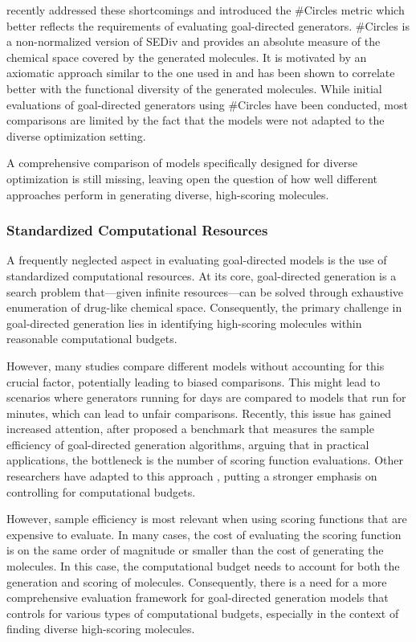 \citet{xieHowMuchSpace2023} recently addressed these shortcomings and introduced the \#Circles
metric which better reflects the requirements of evaluating goal-directed generators. \#Circles is a
non-normalized version of \ac{SEDiv} and provides an absolute measure of the chemical space covered by
the generated molecules. It is motivated by an axiomatic approach similar to the one used in
\citep{waldmanNovelAlgorithmsOptimization2000} and has been shown to correlate better with the
functional diversity of the generated molecules. While initial evaluations of goal-directed generators using \#Circles have been conducted, most comparisons are limited by the
fact that the models were not adapted to the diverse optimization setting.

A comprehensive
comparison of models specifically designed for diverse optimization is still missing, leaving open
the question of how well different approaches perform in generating diverse, high-scoring molecules.

\subsubsection{Standardized Computational Resources}
A frequently neglected aspect in evaluating goal-directed models is the use of standardized
computational resources. At its core, goal-directed generation is a search problem
that—given infinite resources—can be solved through exhaustive enumeration of drug-like chemical space.
Consequently, the primary challenge in goal-directed generation lies in identifying high-scoring molecules
within reasonable computational budgets.

However, many studies compare different models without accounting for this crucial factor,
potentially leading to biased comparisons. This might lead to scenarios where generators running for
days are compared to models that run for minutes, which can lead to unfair comparisons. Recently,
this issue has gained increased attention, after \citep{gaoSampleEfficiencyMatters2022} proposed a
benchmark that measures the sample efficiency of goal-directed generation algorithms, arguing
that in practical applications, the bottleneck is the number of scoring function evaluations. Other
researchers have adapted to this approach \citep{thomasReevaluatingSampleEfficiency2022,thomasAugmentedHillClimbIncreases2022,guoAugmentedMemoryCapitalizing2023},
putting a stronger emphasis on controlling for computational budgets.

However, sample efficiency is most relevant when using scoring functions that are expensive to
evaluate. In many cases, the cost of evaluating the scoring function is on the same order of
magnitude or smaller than the cost of generating the molecules. In this case, the computational
budget needs to account for both the generation and scoring of molecules. Consequently, there is a
need for a more comprehensive evaluation framework for goal-directed generation models that controls
for various types of computational budgets, especially in the context of finding diverse high-scoring
molecules.

